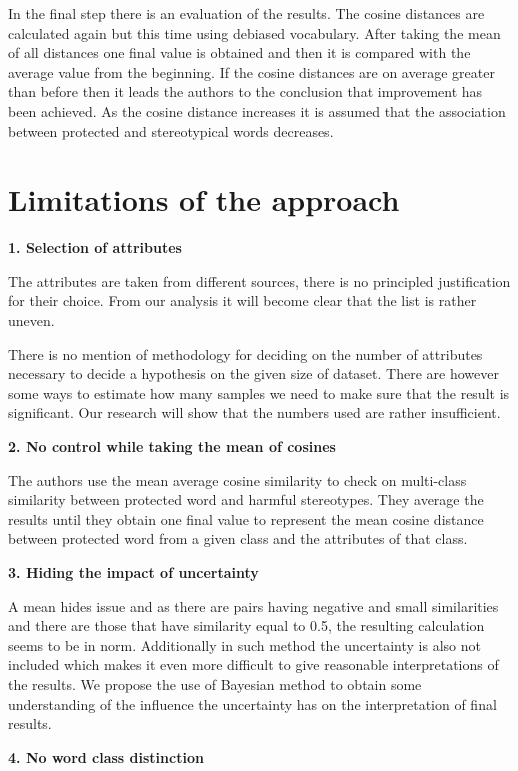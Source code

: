 \documentclass[
  12pt,
]{book}
\begin{document}
In the final step there is an evaluation of the results. The cosine distances are calculated again but this time using debiased vocabulary. After taking the mean of all distances one final value is obtained and then it is compared with the average value from the beginning. If the cosine distances are on average greater than before then it leads the authors to the conclusion that improvement has been achieved. As the cosine distance increases it is assumed that the association between protected and stereotypical words decreases.

\hypertarget{limitations-of-the-approach}{%
\section{Limitations of the approach}\label{limitations-of-the-approach}}

\textbf{1. Selection of attributes}

The attributes are taken from different sources, there is no principled justification for their choice. From our analysis it will become clear that
the list is rather uneven.

There is no mention of methodology for deciding on the number of attributes necessary to decide a hypothesis on the given size of dataset. There are however some ways to estimate how many samples we need to make sure that the result is significant. Our research will show that the numbers used
are rather insufficient.

\textbf{2. No control while taking the mean of cosines}

The authors use the mean average cosine similarity to check on multi-class similarity between protected word and harmful stereotypes.
They average the results until they obtain one final value to represent the mean cosine distance between protected word from a given class and the attributes of that class.

\textbf{3. Hiding the impact of uncertainty}

A mean hides issue and as there are pairs having negative and small similarities and there are those that have similarity equal to 0.5, the resulting calculation seems to be in norm. Additionally in such method the uncertainty is also not included which makes it even more difficult to give reasonable interpretations of the results. We propose the use of Bayesian method to obtain some understanding of the influence the uncertainty has on the interpretation of final results.

\textbf{4. No word class distinction}
\end{document}

